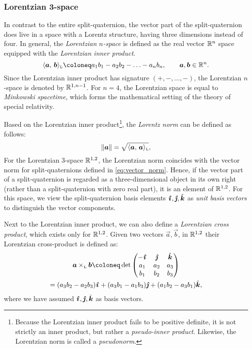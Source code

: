 \subsubsection{Lorentzian 3-space}
In contrast to the entire split-quaternion, the vector part of the split-quaternion does live in a space with a Lorentz structure, having three dimensions instead of four. In general, the \emph{Lorentzian $n$-space} is defined as the real vector $\mathbb{R}^n$ space equipped with the \emph{Lorentzian inner product}. 
\begin{equation}
     \lorinner{\vec{a}}{\vec{b}} \coloneq a_1b_1 - a_2b_2 - \ldots - a_nb_n, \qquad \vec{a}, \vec{b} \in \real^n.
     \label{eq:lorinner}
\end{equation}
Since the Lorentzian inner product has signature $(+, -, \ldots, -)$, the Lorentzian $n$-space is denoted by $\mathbb{R}^{1, n-1}$. For $n = 4$, the Lorentzian space is equal to \emph{Minkowski spacetime}, which forms the mathematical setting of the theory of special relativity. 

Based on the Lorentzian inner product\footnote
{
    Because the Lorentzian inner product fails to be positive definite, it is not strictly an inner product, but rather a \emph{pseudo-inner product}. Likewise, the Lorentzian norm is called a \emph{pseudonorm}.
}, the \emph{Lorentz norm} can be defined as follows:
\begin{equation}
    \norm{\vec{a}} = \sqrt{\lorinner{\vec{a}}{\vec{a}}},
\end{equation}
For the Lorentzian 3-space $\mathbb{R}^{1, 2}$, the Lorentzian norm coincides with the vector norm for split-quaternions defined in \cref{eq:vector_norm}. Hence, if the vector part of a split-quaternion is regarded as a three-dimensional object in its own right (rather than a split-quaternion with zero real part), it is an element of $\mathbb{R}^{1, 2}$. For this space, we view the split-quaternion basis elements $\quati, \quatj, \quatk$ as \emph{unit basis vectors} to distinguish the vector components.

Next to the Lorentzian inner product, we can also define a \emph{Lorentzian cross product}, which exists only for $\mathbb{R}^{1, 2}$. Given two vectors $\vec{a}, \vec{b}$, in $\mathbb{R}^{1, 2}$
their Lorentzian cross-product is defined as: \cite{Jafari2014}
\begin{gather}
        \lorcrossp{\vec{a}}{\vec{b}} \coloneq \det\mqty(-\quati & \quatj & \quatk \\ a_1 & a_2 & a_3 \\ b_1 & b_2 & b_3)  \\
            = \qty(a_3b_2 - a_2b_3)\quati + \qty(a_3b_1 - a_1b_3)\quatj + \qty(a_1b_2 - a_3b_1)\quatk,
        \label{eq:lorcross}
\end{gather}
where we have assumed $\quati, \quatj, \quatk$ as basis vectors.

